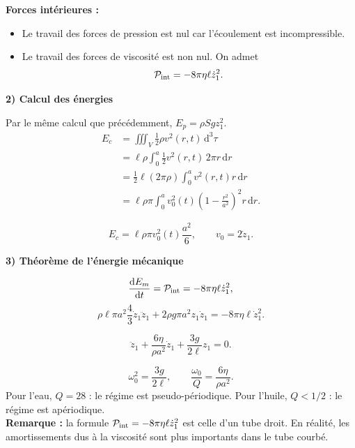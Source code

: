 \documentclass[11pt,a4paper]{article}
\newcommand{\dd}{\mathrm d}
\newcommand{\etape}[1]{\par\medskip\textbf{#1}\par\nopagebreak[4]}
\begin{document}
\begin{exemple}[breakable]
\begin{minipage}{\linewidth}
\end{minipage}\par
\par\par\medskip\noindent\begin{minipage}{\linewidth}
\textbf{Forces intérieures :}
\begin{itemize}\item Le travail des forces de pression est nul car l'écoulement est incompressible.
\item Le travail des forces de viscosité est non nul. On admet
\[\mathcal P_{\mathrm{int}}=-8\pi\eta\ell\dot z_1^2.\]\end{itemize}
\end{minipage}\par
\etape{2) Calcul des énergies}
Par le même calcul que précédemment, $E_p=\rho Sgz_1^2$.
\begin{align*}
E_c&=\iiint_V\frac12\rho v^2(r,t)\,\dd^3\tau\\
&=\ell\rho\int_0^a\frac12v^2(r,t)\,2\pi r\,\dd r\\
&=\frac12\ell(2\pi\rho)\int_0^av^2(r,t)r\,\dd r\\
&=\ell\rho\pi\int_0^av_0^2(t)\left(1-\frac{r^2}{a^2}\right)^2r\,\dd r.
\end{align*}
\begin{cadre}\[E_c=\ell\rho\pi v_0^2(t)\frac{a^2}{6},\qquad v_0=2\dot z_1.\]\end{cadre}
\etape{3) Théorème de l'énergie mécanique}
\[\frac{\dd E_m}{\dd t}=\Piint=-8\pi\eta\ell\dot z_1^2,\]
\[\rho\ell\pi a^2\frac43\dot z_1\ddot z_1+2\rho g\pi a^2z_1\dot z_1=-8\pi\eta\ell\dot z_1^2.\]
\begin{cadre}\[\ddot z_1+\frac{6\eta}{\rho a^2}\dot z_1+\frac{3g}{2\ell}z_1=0.\]\end{cadre}
\[\omega_0^2=\frac{3g}{2\ell},\qquad\frac{\omega_0}{Q}=\frac{6\eta}{\rho a^2}.\]
Pour l'eau, $Q=28$ : le régime est pseudo-périodique. Pour l'huile, $Q<1/2$ : le régime est apériodique. \\

\textbf{Remarque :} la formule $\mathcal P_{\mathrm{int}}=-8\pi\eta\ell\dot z_1^2$ est celle d'un tube droit. En réalité, les amortissements dus à la viscosité sont plus importants dans le tube courbé.
\end{exemple}
\end{document}
